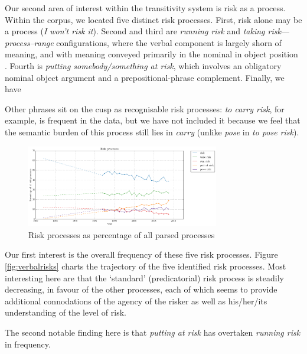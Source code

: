 		Our second area of interest within the transitivity system is risk as a process. Within the corpus, we located five distinct risk processes. First, risk alone may be a process (\emph{I won't risk it}). Second and third are \emph{running risk} and \emph{taking risk}---\emph{process--range} configurations, where the verbal component is largely shorn of meaning, and with meaning conveyed primarily in the nominal in object position \cite{halliday_introduction_2004}. Fourth is \emph{putting somebody/something at risk}, which involves an obligatory nominal object argument and a prepositional-phrase complement. Finally, we have

        Other phrases sit on the cusp as recognisable risk processes: \emph{to carry risk}, for example, is frequent in the data, but we have not included it because we feel that the semantic burden of this process still lies in \emph{carry} (unlike \emph{pose} in \emph{to pose risk}).

			\begin{figure}[htb!]
			\centering
			\includegraphics[width=0.75\textwidth]{../images/risk_processes.png}
			\caption{Risk processes as percentage of all parsed processes}
			\label{fig:riskprocesses}
			\end{figure}
			Our first interest is the overall frequency of these five risk processes. 
            Figure \ref{fig:verbalrisks} charts the trajectory of the five identified risk processes. Most interesting here are that the `standard' (predicatorial) risk process is steadily decreasing, in favour of the other processes, each of which seems to provide additional connodations of the agency of the risker as well as his\slash her\slash its understanding of the level of risk. 

            The second notable finding here is that \emph{putting at risk} has overtaken \emph{running risk} in frequency.

